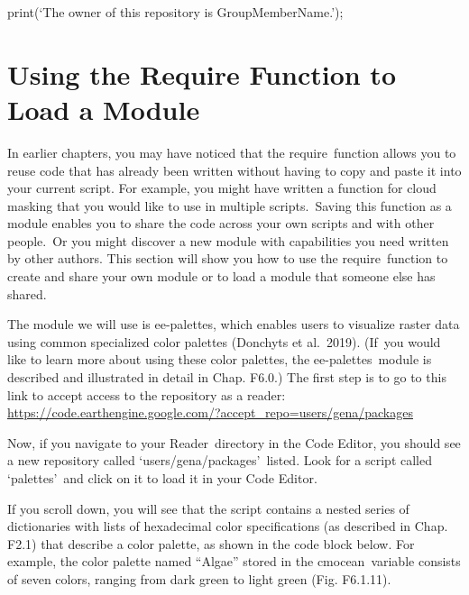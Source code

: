 \documentclass[
  letterpaper,
  DIV=11,
  numbers=noendperiod]{scrreprt}
\begin{document}
print(`The owner of this repository is GroupMemberName.');

\hypertarget{using-the-require-function-to-load-a-module}{%
\section{Using the Require Function to Load a
Module}\label{using-the-require-function-to-load-a-module}}

In earlier chapters, you may have noticed that the require~function
allows you to reuse code that has already been written without having to
copy and paste it into your current script. For example, you might have
written a function for cloud masking that you would like to use in
multiple scripts.~Saving this function as a module enables you to share
the code across your own scripts and with other people.~Or you might
discover a new module with capabilities you need written by other
authors. This section will show you how to use the require~function to
create and share your own module or to load a module that someone else
has shared.

The module we will use is ee-palettes, which enables users to visualize
raster data using common specialized color palettes (Donchyts et
al.~2019). (If~you would like to learn more about using these color
palettes, the ee-palettes~module is described and illustrated in detail
in Chap. F6.0.) The first step is to go to this link to accept access to
the repository as a reader:
\href{https://www.google.com/url?q=https://code.earthengine.google.com/?accept_repo\%3Dusers/gena/packages\&sa=D\&source=editors\&ust=1671458841147867\&usg=AOvVaw2lfbVvfKSe6Nym_B5h25Z7}{https://code.earthengine.google.com/?accept\_repo=users/gena/}\href{https://www.google.com/url?q=https://code.earthengine.google.com/?accept_repo\%3Dusers/gena/packages\&sa=D\&source=editors\&ust=1671458841148247\&usg=AOvVaw396ktWqHZ6LRi90IQjOwxZ}{packages}~

Now, if you navigate to your Reader~directory in the Code Editor, you
should see a new repository called `users/gena/packages'~listed. Look
for a script called `palettes'~and click on it to load it in your Code
Editor.

If you scroll down, you will see that the script contains a nested
series of dictionaries with lists of hexadecimal color specifications
(as described in Chap. F2.1) that describe a color palette, as shown in
the code block below. For example, the color palette named ``Algae''
stored in the cmocean~variable consists of seven colors, ranging from
dark green to light green (Fig. F6.1.11).
\end{document}
